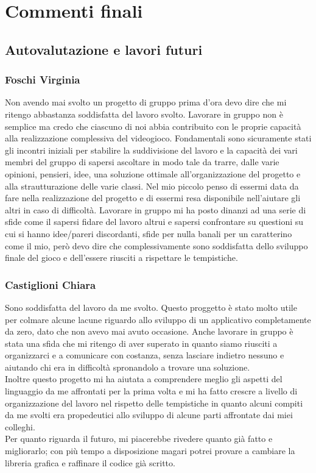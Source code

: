 \documentclass[a4paper,12pt]{report}
\begin{document}
\chapter{Commenti finali}
\section{Autovalutazione e lavori futuri}
\subsection{Foschi Virginia}
Non avendo mai svolto un progetto di gruppo prima d'ora devo dire che mi ritengo abbastanza soddisfatta del lavoro svolto. Lavorare in gruppo non è semplice ma credo che ciascuno di noi abbia contribuito con le proprie capacità alla realizzazione complessiva del videogioco.
Fondamentali sono sicuramente stati gli incontri iniziali per stabilire la suddivisione del lavoro e la capacità dei vari membri del gruppo di sapersi ascoltare in modo tale da trarre, dalle varie opinioni, pensieri, idee, una soluzione ottimale all'organizzazione del progetto e alla strautturazione delle varie classi.
Nel mio piccolo penso di essermi data da fare nella realizzazione del progetto e di essermi resa disponibile nell'aiutare gli altri in caso di difficoltà.
Lavorare in gruppo mi ha posto dinanzi ad una serie di sfide come il sapersi fidare del lavoro altrui e sapersi confrontare su questioni su cui si hanno idee/pareri discordanti, sfide per nulla banali per un caratterino come il mio, però devo dire che complessivamente sono soddisfatta dello sviluppo finale del gioco e dell'essere riusciti a rispettare le tempistiche.
\subsection{Castiglioni Chiara}
Sono soddisfatta del lavoro da me svolto. Questo proggetto è stato molto utile per colmare alcune lacune riguardo allo sviluppo di un applicativo completamente da zero,
dato che non avevo mai avuto occasione. Anche lavorare in gruppo è stata una sfida che mi ritengo di aver superato in quanto siamo riusciti a organizzarci e a comunicare con
costanza, senza lasciare indietro nessuno e aiutando chi era in difficoltà spronandolo a trovare una soluzione.\\
Inoltre questo progetto mi ha aiutata a comprendere meglio gli aspetti del linguaggio da me affrontati per la prima volta e mi ha fatto crescre a livello di organizzazione del lavoro nel rispetto delle
tempistiche in quanto alcuni compiti da me svolti era propedeutici allo sviluppo di alcune parti affrontate dai miei colleghi.
\\Per quanto riguarda il futuro, mi piacerebbe rivedere quanto già fatto e migliorarlo; con più tempo a disposizione magari potrei provare a cambiare la libreria grafica e raffinare il codice già scritto.
\end{document}
